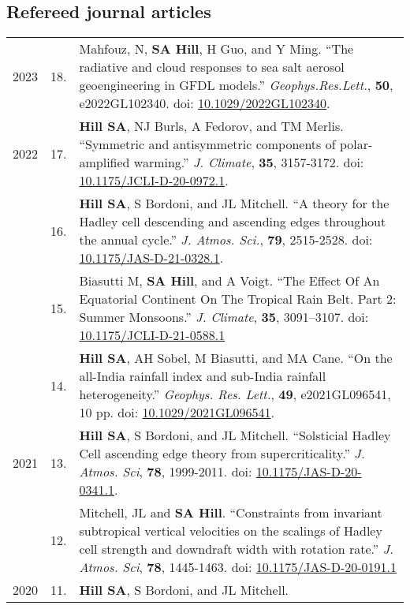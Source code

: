 \documentclass[letterpaper,11pt]{shillcv}
\begin{document}
\subsection*{Refereed journal articles}
\begin{longtable}{@{} Y{0.05\textwidth} >{\color{black}} p{0.04\textwidth} @{} L{0.91\textwidth} @{}}
2023 & 18. & Mahfouz, N, \textbf{SA Hill}, H Guo, and Y Ming. ``The radiative and cloud responses to sea salt aerosol geoengineering in GFDL models.''  \emph{Geophys.\@ Res.\@ Lett.}, \textbf{50}, e2022GL102340.  doi: \href{https://doi.org/10.1029/2022GL102340}{10.1029/2022GL102340}.\\
2022 & 17. & \textbf{Hill SA}, NJ Burls, A Fedorov, and TM Merlis.  ``Symmetric and antisymmetric components of polar-amplified warming.''  \emph{J. Climate}, \textbf{35}, 3157-3172.  doi: \href{https://doi.org/10.1175/JCLI-D-20-0972.1}{10.1175/JCLI-D-20-0972.1}.\\
     & 16. & \textbf{Hill SA}, S Bordoni, and JL Mitchell.  ``A theory for the Hadley cell descending and ascending edges throughout the annual cycle.''  \emph{J. Atmos. Sci.}, \textbf{79}, 2515-2528.  doi: \href{https://doi.org/10.1175/JAS-D-21-0328.1}{10.1175/JAS-D-21-0328.1}.\\
     & 15. & Biasutti M, \textbf{SA Hill}, and A Voigt.  ``The Effect Of An Equatorial Continent On The Tropical Rain Belt. Part 2: Summer Monsoons.''  \emph{J. Climate}, \textbf{35}, 3091–3107.  doi: \href{https://doi.org/10.1175/JCLI-D-21-0588.1}{10.1175/JCLI-D-21-0588.1}\\
     & 14. & \textbf{Hill SA}, AH Sobel, M Biasutti, and MA Cane.  ``On the all-India rainfall index and sub-India rainfall heterogeneity.''  \emph{Geophys. Res. Lett.}, \textbf{49}, e2021GL096541, 10 pp.  doi: \href{https://doi.org/10.1029/2021GL096541}{10.1029/2021GL096541}.\\
2021 & 13. & \textbf{Hill SA}, S Bordoni, and JL Mitchell.  ``Solsticial Hadley Cell ascending edge theory from supercriticality.''  \emph{J. Atmos. Sci}, \textbf{78}, 1999-2011.  doi: \href{https://doi.org/10.1175/JAS-D-20-0341.1}{10.1175/JAS-D-20-0341.1}.\\
     & 12. & Mitchell, JL and \textbf{SA Hill}.  ``Constraints from invariant
subtropical vertical velocities on the scalings of Hadley cell strength and
downdraft width with rotation rate.''  \emph{J. Atmos. Sci}, \textbf{78}, 1445-1463.  doi: \href{https://doi.org/10.1175/JAS-D-20-0191.1}{10.1175/JAS-D-20-0191.1}\\
2020 & 11. & \textbf{Hill SA}, S Bordoni, and JL Mitchell.

\end{longtable}
\end{document}
